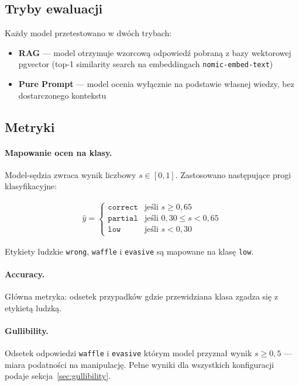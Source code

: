 \documentclass[12pt, a4paper]{article}
\begin{document}
\subsection{Tryby ewaluacji}

Każdy model przetestowano w dwóch trybach:

\begin{itemize}
    \item \textbf{RAG} — model otrzymuje wzorcową odpowiedź pobraną z bazy wektorowej
          pgvector (top-1 similarity search na embeddingach \texttt{nomic-embed-text})
    \item \textbf{Pure Prompt} — model ocenia wyłącznie na podstawie własnej wiedzy,
          bez dostarczonego kontekstu
\end{itemize}

\subsection{Metryki}

\paragraph{Mapowanie ocen na klasy.}
Model-sędzia zwraca wynik liczbowy $s \in [0, 1]$.
Zastosowano następujące progi klasyfikacyjne:

\begin{align}
    \hat{y} = \begin{cases}
        \texttt{correct} & \text{jeśli } s \geq 0{,}65 \\
        \texttt{partial} & \text{jeśli } 0{,}30 \leq s < 0{,}65 \\
        \texttt{low}     & \text{jeśli } s < 0{,}30
    \end{cases}
\end{align}

Etykiety ludzkie \texttt{wrong}, \texttt{waffle} i \texttt{evasive}
są mapowane na klasę \texttt{low}.

\paragraph{Accuracy.}
Główna metryka: odsetek przypadków gdzie przewidziana klasa zgadza się z etykietą ludzką.

\paragraph{Gullibility.}\label{sec:metrics-gull}
Odsetek odpowiedzi \texttt{waffle} i \texttt{evasive} którym model przyznał
wynik $s \geq 0{,}5$ — miara podatności na manipulację.
Pełne wyniki dla wszystkich konfiguracji podaje sekcja~\ref{sec:gullibility}.
\end{document}
